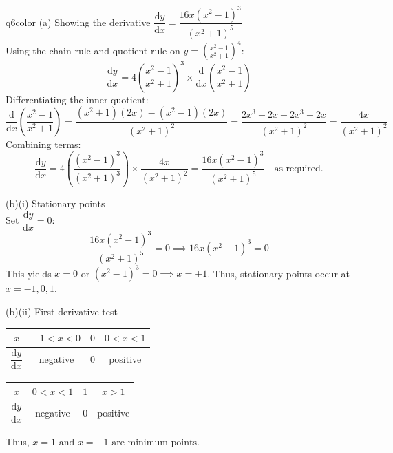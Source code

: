 \documentclass[11pt,a4paper]{article}
\newcommand{\dd}{\mathrm{d}}
\newcommand{\dydx}{\dfrac{\dd y}{\dd x}}
\begin{document}
\begin{ansbox}{q6color}
(a) Showing the derivative $\dfrac{\mathrm{d}y}{\mathrm{d}x} = \dfrac{16x(x^2-1)^3}{(x^2+1)^5}$\\[4pt]
Using the chain rule and quotient rule on $y = \left(\frac{x^2-1}{x^2+1}\right)^4$:
\[
\dydx = 4\left(\frac{x^2-1}{x^2+1}\right)^3 \times \frac{\mathrm{d}}{\mathrm{d}x}\left(\frac{x^2-1}{x^2+1}\right)
\]
Differentiating the inner quotient:
\[
\frac{\mathrm{d}}{\mathrm{d}x}\left(\frac{x^2-1}{x^2+1}\right) = \frac{(x^2+1)(2x) - (x^2-1)(2x)}{(x^2+1)^2} = \frac{2x^3 + 2x - 2x^3 + 2x}{(x^2+1)^2} = \frac{4x}{(x^2+1)^2}
\]
Combining terms:
\[
\dydx = 4\left(\frac{(x^2-1)^3}{(x^2+1)^3}\right) \times \frac{4x}{(x^2+1)^2} = \frac{16x(x^2-1)^3}{(x^2+1)^5} \quad \text{as required.}
\]

(b)(i) Stationary points\\[4pt]
Set $\dydx = 0$:
\[
\frac{16x(x^2-1)^3}{(x^2+1)^5} = 0 \implies 16x(x^2-1)^3 = 0
\]
This yields $x = 0$ or $(x^2-1)^3 = 0 \implies x = \pm 1$. Thus, stationary points occur at $x = -1, 0, 1$.

(b)(ii) First derivative test\\[4pt]
\begin{center}
\renewcommand{\arraystretch}{1.3}
\begin{tabular}{|c|c|c|c|}
\hline
$x$ & $-1 < x < 0$ & $0$ & $0 < x < 1$ \\ \hline
$\dfrac{\mathrm{d}y}{\mathrm{d}x}$ & negative & $0$ & positive \\ \hline
\end{tabular}
\end{center}
\begin{center}
\renewcommand{\arraystretch}{1.3}
\begin{tabular}{|c|c|c|c|}
\hline
$x$ & $0 < x < 1$ & $1$ & $x > 1$ \\ \hline
$\dfrac{\mathrm{d}y}{\mathrm{d}x}$ & negative & $0$ & positive \\ \hline
\end{tabular}
\end{center}
Thus, $\boxed{x = 1 \text{ and } x = -1 \text{ are minimum points}}$.
\end{ansbox}
\end{document}
